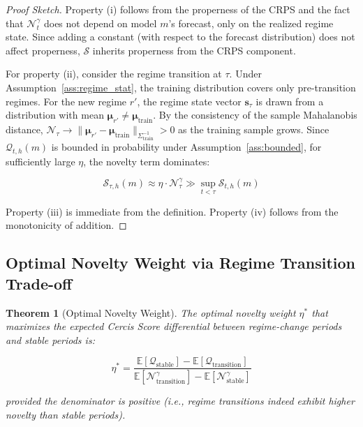 \documentclass[12pt,a4paper]{article}
\newtheorem{theorem}{Theorem}[section]
\begin{document}
\begin{proof}[Proof Sketch]
Property (i) follows from the properness of the CRPS
\citep{gneiting2007strictly} and the fact that $\mathcal{N}_t^{\gamma}$
does not depend on model $m$'s forecast, only on the realized regime
state.  Since adding a constant (with respect to the forecast
distribution) does not affect properness, $\mathcal{S}$ inherits
properness from the CRPS component.

For property (ii), consider the regime transition at $\tau$.  Under
Assumption~\ref{ass:regime_stat}, the training distribution covers
only pre-transition regimes.  For the new regime $r'$, the regime
state vector $\mathbf{s}_\tau$ is drawn from a distribution with
mean $\boldsymbol{\mu}_{r'} \neq \boldsymbol{\mu}_{\text{train}}$.
By the consistency of the sample Mahalanobis distance,
$\mathcal{N}_\tau \to \|\boldsymbol{\mu}_{r'} -
\boldsymbol{\mu}_{\text{train}}\|_{\Sigma_{\text{train}}^{-1}} > 0$
as the training sample grows.  Since $\mathcal{Q}_{t,h}(m)$ is
bounded in probability under Assumption~\ref{ass:bounded}, for
sufficiently large $\eta$, the novelty term dominates:

\begin{equation}
    \mathcal{S}_{\tau,h}(m) \approx \eta \cdot
    \mathcal{N}_\tau^{\gamma} \gg \sup_{t < \tau}
    \mathcal{S}_{t,h}(m) \label{eq:domination}
\end{equation}

Property (iii) is immediate from the definition.  Property (iv)
follows from the monotonicity of addition.
\end{proof}

\subsection{Optimal Novelty Weight via Regime Transition Trade-off}

\begin{theorem}[Optimal Novelty Weight]
\label{thm:optimal_eta}
The optimal novelty weight $\eta^*$ that maximizes the expected
Cercis Score differential between regime-change periods and stable
periods is:

\begin{equation}
    \eta^* = \frac{\mathbb{E}[\mathcal{Q}_{\text{stable}}] -
    \mathbb{E}[\mathcal{Q}_{\text{transition}}]}
    {\mathbb{E}[\mathcal{N}_{\text{transition}}^{\gamma}] -
    \mathbb{E}[\mathcal{N}_{\text{stable}}^{\gamma}]}
    \label{eq:optimal_eta}
\end{equation}

provided the denominator is positive (i.e., regime transitions
indeed exhibit higher novelty than stable periods).
\end{theorem}
\end{document}
